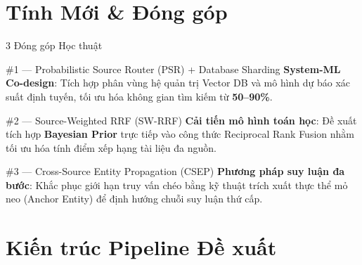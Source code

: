 \documentclass[aspectratio=169,11pt]{beamer}
\begin{document}
\section{Tính Mới \& Đóng góp}

\begin{frame}{3 Đóng góp Học thuật}

\begin{block}{\#1 --- Probabilistic Source Router (PSR) + Database Sharding}
\textbf{System-ML Co-design}: Tích hợp phân vùng hệ quản trị Vector DB và mô hình dự báo xác suất định tuyến, tối ưu hóa không gian tìm kiếm từ \textbf{50--90\%}.
\end{block}

\vspace{0.2cm}
\begin{block}{\#2 --- Source-Weighted RRF (SW-RRF)}
\textbf{Cải tiến mô hình toán học}: Đề xuất tích hợp \textbf{Bayesian Prior} trực tiếp vào công thức Reciprocal Rank Fusion nhằm tối ưu hóa tính điểm xếp hạng tài liệu đa nguồn.
\end{block}

\vspace{0.2cm}
\begin{block}{\#3 --- Cross-Source Entity Propagation (CSEP)}
\textbf{Phương pháp suy luận đa bước}: Khắc phục giới hạn truy vấn chéo bằng kỹ thuật trích xuất thực thể mỏ neo (Anchor Entity) để định hướng chuỗi suy luận thứ cấp.
\end{block}
\end{frame}

\section{Kiến trúc Pipeline Đề xuất}
\end{document}
